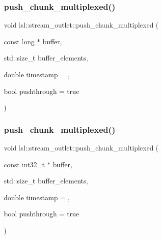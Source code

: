 \mbox{\label{classlsl_1_1stream__outlet_a4953cee1905211d533cb9bd6b0525099}} 
\subsubsection{\texorpdfstring{push\+\_\+chunk\+\_\+multiplexed()}{push\_chunk\_multiplexed()}\hspace{0.1cm}{\footnotesize\ttfamily [17/28]}}
{\footnotesize\ttfamily void lsl\+::stream\+\_\+outlet\+::push\+\_\+chunk\+\_\+multiplexed (\begin{DoxyParamCaption}\item[{const long $\ast$}]{buffer,  }\item[{std\+::size\+\_\+t}]{buffer\+\_\+elements,  }\item[{double}]{timestamp = {},  }\item[{bool}]{pushthrough = {\ttfamily true} }\end{DoxyParamCaption})\hspace{0.3cm}{\ttfamily [inline]}}

\mbox{\label{classlsl_1_1stream__outlet_a161ead63f9a373d69744c3c54a650c1d}} 
\subsubsection{\texorpdfstring{push\+\_\+chunk\+\_\+multiplexed()}{push\_chunk\_multiplexed()}\hspace{0.1cm}{\footnotesize\ttfamily [18/28]}}
{\footnotesize\ttfamily void lsl\+::stream\+\_\+outlet\+::push\+\_\+chunk\+\_\+multiplexed (\begin{DoxyParamCaption}\item[{const int32\+\_\+t $\ast$}]{buffer,  }\item[{std\+::size\+\_\+t}]{buffer\+\_\+elements,  }\item[{double}]{timestamp = {},  }\item[{bool}]{pushthrough = {\ttfamily true} }\end{DoxyParamCaption})\hspace{0.3cm}{\ttfamily [inline]}}

